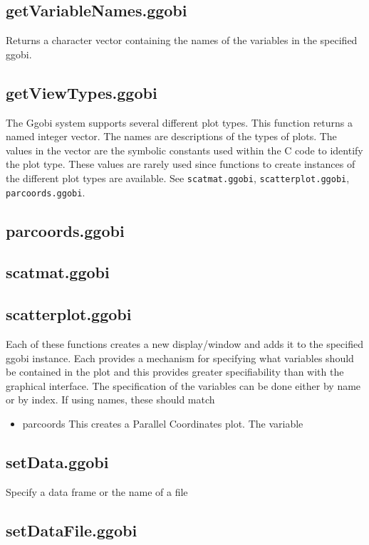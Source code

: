 \documentclass{article}
\def\SFunction#1{{\texttt{\red #1}}}
\begin{document}
\subsection{getVariableNames.ggobi}
Returns  a character vector 
containing the names of the variables
in the specified ggobi.

\subsection{getViewTypes.ggobi}
The Ggobi system supports several different plot types. This function
returns a named integer vector. The names are descriptions of the
types of plots.  The values in the vector are the symbolic constants
used within the C code to identify the plot type.  These values are
rarely used since functions to create instances of the different plot
types are available.  See \SFunction{scatmat.ggobi},
\SFunction{scatterplot.ggobi}, \SFunction{parcoords.ggobi}.

\subsection{parcoords.ggobi}
\subsection{scatmat.ggobi}
\subsection{scatterplot.ggobi}
Each of these functions creates a new display/window and adds it to
the specified ggobi instance.  Each provides a mechanism for
specifying what variables should be contained in the plot and this
provides greater specifiability than with the graphical interface.
The specification of the variables can be done either by 
name or by index.
If using names, these should match
\begin{itemize}
\item{parcoords}
This creates a Parallel Coordinates plot.
The variable
\end{itemize}





\subsection{setData.ggobi}
Specify a data frame or the name of a file

\subsection{setDataFile.ggobi}
\end{document}
